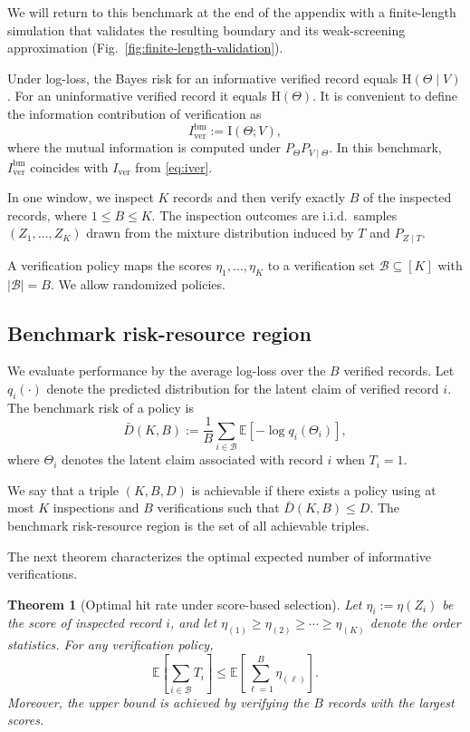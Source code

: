 \documentclass[twocolumn]{scholar7}
\newtheorem{theorem}{Theorem}
\newcommand{\cB}{\mathcal{B}}
\newcommand{\E}{\mathbb{E}}
\newcommand{\I}{\mathrm{I}}
\newcommand{\Hh}{\mathrm{H}}
\newcommand{\abs}[1]{\left|#1\right|}
\newcommand{\bracks}[1]{\left[#1\right]}
\newcommand{\idx}[1]{\bracks{#1}} %
\begin{document}
\begin{appendix}
We will return to this benchmark at the end of the appendix with a finite-length simulation that validates the resulting boundary and its weak-screening approximation (Fig.~\ref{fig:finite-length-validation}).

Under log-loss, the Bayes risk for an informative verified record equals $\Hh(\Theta\mid V)$.
For an uninformative verified record it equals $\Hh(\Theta)$.
It is convenient to define the information contribution of verification as
\begin{equation}
  I_{\mathrm{ver}}^{\mathrm{bm}} := \I(\Theta;V),
  \label{eq:Iver-bm}
\end{equation}
where the mutual information is computed under $P_\Theta P_{V\mid\Theta}$.
In this benchmark, $I_{\mathrm{ver}}^{\mathrm{bm}}$ coincides with $I_{\mathrm{ver}}$ from \eqref{eq:iver}.

In one window, we inspect $K$ records and then verify exactly $B$ of the inspected records, where $1\le B\le K$.
The inspection outcomes are i.i.d.\ samples $(Z_1,\dots,Z_K)$ drawn from the mixture distribution induced by $T$ and $P_{Z\mid T}$.

A verification policy maps the scores $\eta_1,\dots,\eta_K$ to a verification set $\cB\subseteq\idx{K}$ with $\abs{\cB}=B$.
We allow randomized policies.

\subsection{Benchmark risk-resource region}
We evaluate performance by the average log-loss over the $B$ verified records.
Let $q_i(\cdot)$ denote the predicted distribution for the latent claim of verified record $i$.
The benchmark risk of a policy is
\begin{equation}
  \bar{D}(K,B) := \frac{1}{B}\sum_{i\in\cB} \E\bracks{-\log q_i(\Theta_i)},
  \label{eq:risk-verified-bar}
\end{equation}
where $\Theta_i$ denotes the latent claim associated with record $i$ when $T_i=1$.

We say that a triple $(K,B,D)$ is achievable if there exists a policy using at most $K$ inspections and $B$ verifications such that $\bar{D}(K,B)\le D$.
The benchmark risk-resource region is the set of all achievable triples.

The next theorem characterizes the optimal expected number of informative verifications.

\begin{theorem}[Optimal hit rate under score-based selection]
\label{thm:optimal-hitrate}
Let $\eta_i:=\eta(Z_i)$ be the score of inspected record $i$, and let $\eta_{(1)}\ge \eta_{(2)}\ge \cdots \ge \eta_{(K)}$ denote the order statistics.
For any verification policy,
\begin{equation}
  \E\bracks{\sum_{i\in\cB} T_i}
  \le
  \E\bracks{\sum_{\ell=1}^{B} \eta_{(\ell)}}.
  \label{eq:hit-rate-opt}
\end{equation}
Moreover, the upper bound is achieved by verifying the $B$ records with the largest scores.
\end{theorem}


\end{appendix}
\end{document}
